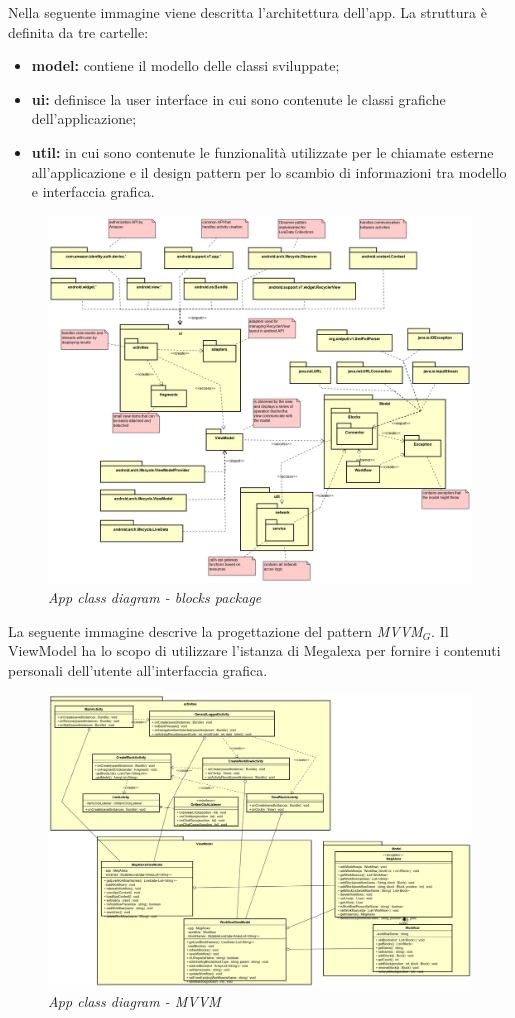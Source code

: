 Nella seguente immagine viene descritta l'architettura dell'app.
La struttura è definita da tre cartelle:
\begin{itemize}
	\item \textbf{model:} contiene il modello delle classi sviluppate;
	\item \textbf{ui:} definisce la user interface in cui sono contenute le classi grafiche dell'applicazione;
	\item \textbf{util:} in cui sono contenute le funzionalità utilizzate per le chiamate esterne all'applicazione e il design pattern per lo scambio di informazioni tra modello e interfaccia grafica.

\end{itemize}
\begin{figure} [H]
	\centering
	\includegraphics[scale=0.3]{./images/Package.png}
	\caption{\textit{App class diagram - blocks package}}\label{Package}
\end{figure}
\newpage
La seguente immagine descrive la progettazione del pattern \textit{MVVM$_{G}$}.
Il ViewModel ha lo scopo di utilizzare l'istanza di Megalexa per fornire i contenuti personali dell'utente all'interfaccia grafica.
\begin{figure} [H]
	\centering
	\includegraphics[scale=0.27]{./images/MVVM.png}
	\caption{\textit{App class diagram - MVVM}}\label{MVVM}
\end{figure}
